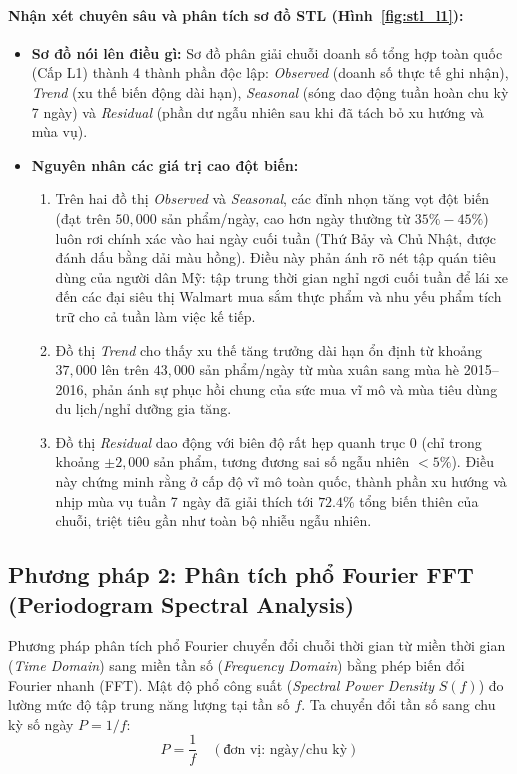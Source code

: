 \documentclass[12pt,a4paper,oneside]{article}
\begin{document}
\paragraph{Nhận xét chuyên sâu và phân tích sơ đồ STL (Hình~\ref{fig:stl_l1}):}
\begin{itemize}
    \item \textbf{Sơ đồ nói lên điều gì:} Sơ đồ phân giải chuỗi doanh số tổng hợp toàn quốc (Cấp L1) thành 4 thành phần độc lập: \textit{Observed} (doanh số thực tế ghi nhận), \textit{Trend} (xu thế biến động dài hạn), \textit{Seasonal} (sóng dao động tuần hoàn chu kỳ 7 ngày) và \textit{Residual} (phần dư ngẫu nhiên sau khi đã tách bỏ xu hướng và mùa vụ).
    \item \textbf{Nguyên nhân các giá trị cao đột biến:}
    \begin{enumerate}
        \item Trên hai đồ thị \textit{Observed} và \textit{Seasonal}, các đỉnh nhọn tăng vọt đột biến (đạt trên $50{,}000$ sản phẩm/ngày, cao hơn ngày thường từ $35\% - 45\%$) luôn rơi chính xác vào hai ngày cuối tuần (Thứ Bảy và Chủ Nhật, được đánh dấu bằng dải màu hồng). Điều này phản ánh rõ nét tập quán tiêu dùng của người dân Mỹ: tập trung thời gian nghỉ ngơi cuối tuần để lái xe đến các đại siêu thị Walmart mua sắm thực phẩm và nhu yếu phẩm tích trữ cho cả tuần làm việc kế tiếp.
        \item Đồ thị \textit{Trend} cho thấy xu thế tăng trưởng dài hạn ổn định từ khoảng $37{,}000$ lên trên $43{,}000$ sản phẩm/ngày từ mùa xuân sang mùa hè 2015--2016, phản ánh sự phục hồi chung của sức mua vĩ mô và mùa tiêu dùng du lịch/nghỉ dưỡng gia tăng.
        \item Đồ thị \textit{Residual} dao động với biên độ rất hẹp quanh trục 0 (chỉ trong khoảng $\pm 2{,}000$ sản phẩm, tương đương sai số ngẫu nhiên $< 5\%$). Điều này chứng minh rằng ở cấp độ vĩ mô toàn quốc, thành phần xu hướng và nhịp mùa vụ tuần 7 ngày đã giải thích tới $72.4\%$ tổng biến thiên của chuỗi, triệt tiêu gần như toàn bộ nhiễu ngẫu nhiên.
    \end{enumerate}
\end{itemize}

\subsection{Phương pháp 2: Phân tích phổ Fourier FFT (Periodogram Spectral Analysis)}
Phương pháp phân tích phổ Fourier chuyển đổi chuỗi thời gian từ miền thời gian (\textit{Time Domain}) sang miền tần số (\textit{Frequency Domain}) bằng phép biến đổi Fourier nhanh (FFT). Mật độ phổ công suất (\textit{Spectral Power Density} $S(f)$) đo lường mức độ tập trung năng lượng tại tần số $f$. Ta chuyển đổi tần số sang chu kỳ số ngày $P = 1/f$:
\begin{equation}
    P = \frac{1}{f} \quad (\text{đơn vị: ngày/chu kỳ})
\end{equation}
\end{document}
